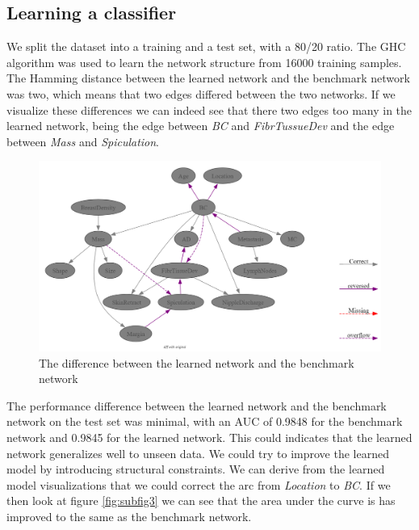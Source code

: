 \documentclass{article}
\begin{document}
\subsection{Learning a classifier}
We split the dataset into a training and a test set, with a 80/20 ratio. The GHC algorithm was used to learn the network structure from 16000 training samples.
The Hamming distance between the learned network and the benchmark network was two, which means that two edges differed between the two networks.
If we visualize these differences we can indeed see that there two edges too many in the learned network, being the edge between \textit{BC} and \textit{FibrTussueDev} and the edge between \textit{Mass} and \textit{Spiculation}.
\begin{figure}[H]
    \centering
    \includegraphics[width=\textwidth]{../figures/Breast_cancer_learned_diff.png}
    \caption{The difference between the learned network and the benchmark network}
    \label{fig:network_diff}
\end{figure}
The performance difference between the learned network and the benchmark network on the test set was minimal, with an AUC of 0.9848 for the benchmark network and 0.9845 for the learned network.
This could indicates that the learned network generalizes well to unseen data. We could try to improve the learned model by introducing structural constraints.
We can derive from the learned model visualizations that we could correct the arc from \textit{Location} to \textit{BC}.
If we then look at figure \ref{fig:subfig3} we can see that the area under the curve is has improved to the same as the benchmark network.
\end{document}
